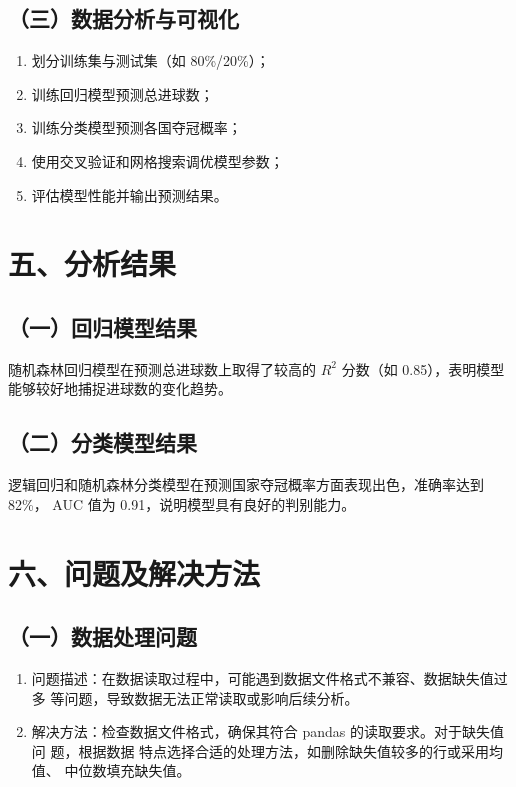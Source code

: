 \documentclass[UTF8]{ctexart}
\begin{document}
	\subsection*{（三）数据分析与可视化}
	\begin{enumerate}
		\item 划分训练集与测试集（如 80\%/20\%）；
		\item 训练回归模型预测总进球数；
		\item 训练分类模型预测各国夺冠概率；
		\item 使用交叉验证和网格搜索调优模型参数；
		\item 评估模型性能并输出预测结果。
	\end{enumerate}
	
	\section*{五、分析结果}
	
	\subsection*{（一）回归模型结果}
	随机森林回归模型在预测总进球数上取得了较高的 $R^2$ 分数（如 0.85），表明模型能够较好地捕捉进球数的变化趋势。
	
	\subsection*{（二）分类模型结果}
	逻辑回归和随机森林分类模型在预测国家夺冠概率方面表现出色，准确率达到 82\%，
	AUC 值为 0.91，说明模型具有良好的判别能力。
	
	\section*{六、问题及解决方法}
	
	\subsection*{（一）数据处理问题}
	\begin{enumerate}
		\item 问题描述：在数据读取过程中，可能遇到数据文件格式不兼容、数据缺失值过多
		等问题，导致数据无法正常读取或影响后续分析。
		\item 解决方法：检查数据文件格式，确保其符合 pandas 的读取要求。对于缺失值问
		题，根据数据 特点选择合适的处理方法，如删除缺失值较多的行或采用均值、
		中位数填充缺失值。
	\end{enumerate}
	
\end{document}
